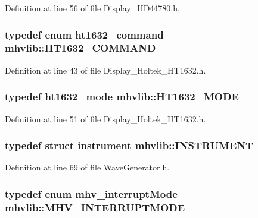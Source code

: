 Definition at line 56 of file Display\-\_\-\-H\-D44780.\-h.

\hypertarget{namespacemhvlib_aca900e05b6564a3da702081e7b394379}{
\subsubsection[{H\-T1632\-\_\-\-C\-O\-M\-M\-A\-N\-D}]{\setlength{\rightskip}{0pt plus 5cm}typedef enum {\bf ht1632\-\_\-command} {\bf mhvlib\-::\-H\-T1632\-\_\-\-C\-O\-M\-M\-A\-N\-D}}}\label{namespacemhvlib_aca900e05b6564a3da702081e7b394379}


Definition at line 43 of file Display\-\_\-\-Holtek\-\_\-\-H\-T1632.\-h.

\hypertarget{namespacemhvlib_ab8e91a9eed76f8015375b6681b4a641a}{
\subsubsection[{H\-T1632\-\_\-\-M\-O\-D\-E}]{\setlength{\rightskip}{0pt plus 5cm}typedef {\bf ht1632\-\_\-mode} {\bf mhvlib\-::\-H\-T1632\-\_\-\-M\-O\-D\-E}}}\label{namespacemhvlib_ab8e91a9eed76f8015375b6681b4a641a}


Definition at line 51 of file Display\-\_\-\-Holtek\-\_\-\-H\-T1632.\-h.

\hypertarget{namespacemhvlib_abe46c8922ff2f901a0a36e388bb411bc}{
\subsubsection[{I\-N\-S\-T\-R\-U\-M\-E\-N\-T}]{\setlength{\rightskip}{0pt plus 5cm}typedef struct {\bf instrument} {\bf mhvlib\-::\-I\-N\-S\-T\-R\-U\-M\-E\-N\-T}}}\label{namespacemhvlib_abe46c8922ff2f901a0a36e388bb411bc}


Definition at line 69 of file Wave\-Generator.\-h.

\hypertarget{namespacemhvlib_a6d4bdd6a3350e14306ea380cf5bba370}{
\subsubsection[{M\-H\-V\-\_\-\-I\-N\-T\-E\-R\-R\-U\-P\-T\-M\-O\-D\-E}]{\setlength{\rightskip}{0pt plus 5cm}typedef enum {\bf mhv\-\_\-interrupt\-Mode} {\bf mhvlib\-::\-M\-H\-V\-\_\-\-I\-N\-T\-E\-R\-R\-U\-P\-T\-M\-O\-D\-E}}}\label{namespacemhvlib_a6d4bdd6a3350e14306ea380cf5bba370}


